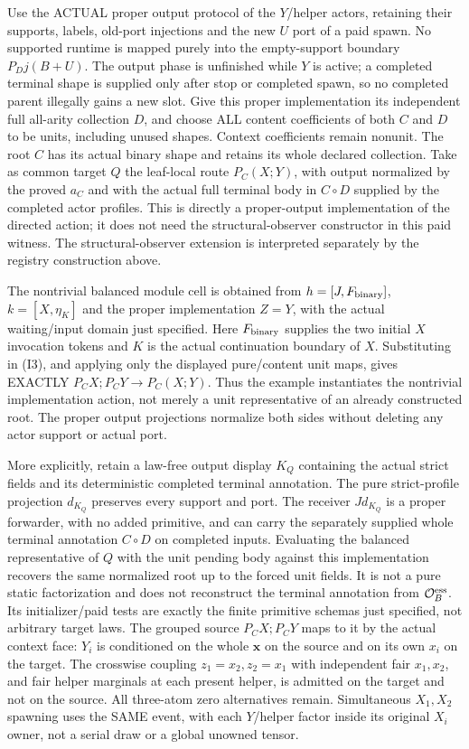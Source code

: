 \documentclass[11pt]{article}
\begin{document}
Use the ACTUAL proper output protocol of the $Y$/helper actors, retaining their supports, labels, old-port injections and the new $U$ port of a paid spawn. No supported runtime is mapped purely into the empty-support boundary $P_Dj(B+U)$. The output phase is unfinished while $Y$ is active; a completed terminal shape is supplied only after stop or completed spawn, so no completed parent illegally gains a new slot. Give this proper implementation its independent full all-arity collection $D$, and choose ALL content coefficients of both $C$ and $D$ to be units, including unused shapes. Context coefficients remain nonunit. The root $C$ has its actual binary shape and retains its whole declared collection. Take as common target $Q$ the leaf-local route $P_C(X;Y)$, with output normalized by the proved $a_C$ and with the actual full terminal body in $C\circ D$ supplied by the completed actor profiles. This is directly a proper-output implementation of the directed action; it does not need the structural-observer constructor in this paid witness. The structural-observer extension is interpreted separately by the registry construction above.

The nontrivial balanced module cell is obtained from $h=[J,F_{\rm binary}]$, $k=[X,\eta_K]$ and the proper implementation $Z=Y$, with the actual waiting/input domain just specified. Here $F_{\rm binary}$ supplies the two initial $X$ invocation tokens and $K$ is the actual continuation boundary of $X$. Substituting in (I3), and applying only the displayed pure/content unit maps, gives EXACTLY $P_CX;P_CY\to P_C(X;Y)$. Thus the example instantiates the nontrivial implementation action, not merely a unit representative of an already constructed root. The proper output projections normalize both sides without deleting any actor support or actual port.

More explicitly, retain a law-free output display $K_Q$ containing the actual strict fields and its deterministic completed terminal annotation. The pure strict-profile projection $d_{K_Q}$ preserves every support and port. The receiver $Jd_{K_Q}$ is a proper forwarder, with no added primitive, and can carry the separately supplied whole terminal annotation $C\circ D$ on completed inputs. Evaluating the balanced representative of $Q$ with the unit pending body against this implementation recovers the same normalized root up to the forced unit fields. It is not a pure static factorization and does not reconstruct the terminal annotation from $\mathcal O_B^{\rm ess}$. Its initializer/paid tests are exactly the finite primitive schemas just specified, not arbitrary target laws. The grouped source $P_CX;P_CY$ maps to it by the actual context face: $Y_i$ is conditioned on the whole $\boldsymbol x$ on the source and on its own $x_i$ on the target. The crosswise coupling $z_1=x_2,z_2=x_1$ with independent fair $x_1,x_2$, and fair helper marginals at each present helper, is admitted on the target and not on the source. All three-atom zero alternatives remain. Simultaneous $X_1,X_2$ spawning uses the SAME event, with each $Y$/helper factor inside its original $X_i$ owner, not a serial draw or a global unowned tensor.
\end{document}
